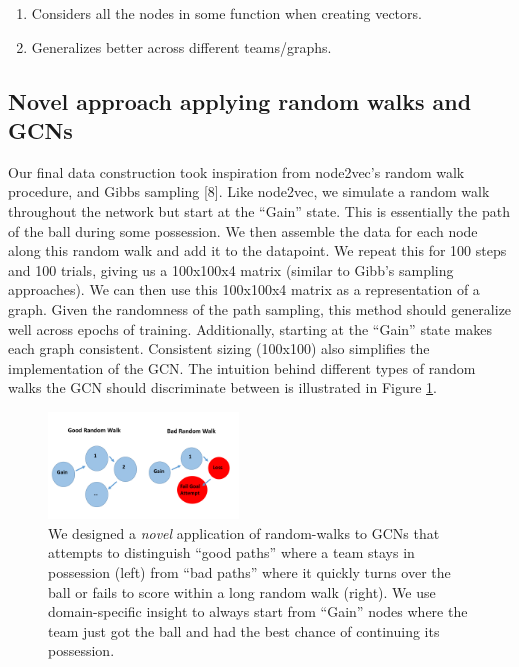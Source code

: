 \begin{enumerate}
    \item Considers all the nodes in some function when creating vectors.

    \item Generalizes better across different teams/graphs. 
\end{enumerate}

\subsection{Novel approach applying random walks and GCNs}
Our final data construction took inspiration from node2vec's random walk procedure, and Gibbs sampling [8]. Like node2vec, we simulate a random walk throughout the network but start at the ``Gain'' state. This is essentially the path of the ball during some possession.  We then assemble the data for each node along this random walk and add it to the datapoint. We repeat this for 100 steps and 100 trials, giving us a 100x100x4 matrix (similar to Gibb's sampling approaches). We can then use this 100x100x4 matrix as a representation of a graph. Given the randomness of the path sampling, this method should generalize well across epochs of training. Additionally, starting at the ``Gain'' state makes each graph consistent. Consistent sizing (100x100) also simplifies the implementation of the GCN. The intuition behind different types of random walks the GCN should discriminate between is illustrated in Figure \ref{fig:intuition}.


\begin{figure}[h]
  \centering
  \includegraphics[width=0.45\textwidth]{plots/graph_CNN_intuition.pdf}
  \caption{We designed a \textit{novel} application of random-walks to GCNs that attempts to distinguish ``good paths'' where a team stays in possession (left) from ``bad paths'' where it quickly turns over the ball or fails to score within a long random walk (right). We use domain-specific insight to always start from ``Gain'' nodes where the team just got the ball and had the best chance of continuing its possession.}
  \label{fig:intuition}
\end{figure}

